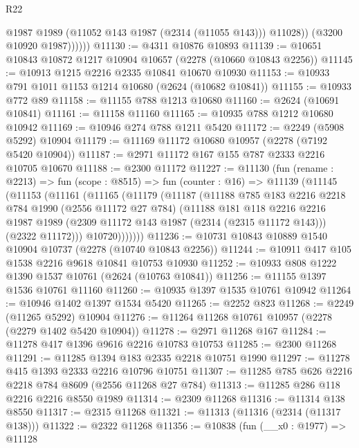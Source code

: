 \begin{lexlean}{R22}
\begin{coremodule}
                  @1987
                  @1989
                  (@11052 @143 @1987 (@2314 (@11055 @143)))
                  @11028))
              (@3200 @10920 @1987))))))
@11130 := @4311 @10876 @10893
@11139 := @10651 @10843 @10872 @1217 @10904 @10657 (@2278 (@10660 @10843 @2256))
@11145 := @10913 @1215 @2216 @2335 @10841 @10670 @10930
@11153 := @10933 @791 @1011 @1153 @1214 @10680 (@2624 (@10682 @10841))
@11155 := @10933 @772 @89
@11158 := @11155 @788 @1213 @10680
@11160 := @2624 (@10691 @10841)
@11161 := @11158 @11160
@11165 := @10935 @788 @1212 @10680 @10942
@11169 := @10946 @274 @788 @1211 @5420
@11172 := @2249 (@5908 @5292) @10904
@11179 := @11169 @11172 @10680 @10957 (@2278 (@7192 @5420 @10904))
@11187 := @2971 @11172 @167 @155 @787 @2333 @2216 @10705 @10670
@11188 := @2300 @11172
@11227 := @11130
    (fun (rename : @2213) =>
    fun (scope : @8515) =>
    fun (counter : @16) =>
    @11139
      (@11145
        (@11153
          (@11161
            (@11165
              (@11179
                (@11187
                  (@11188
                    @785
                    @183
                    @2216
                    @2218
                    @784
                    @1990
                    (@2556 @11172 @27 @784)
                    (@11188
                      @181
                      @118
                      @2216
                      @2216
                      @1987
                      @1989
                      (@2309 @11172 @143 @1987 (@2314 (@2315 @11172 @143)))
                      (@2322 @11172)))
                  @10720)))))))
@11236 := @10731 @10843 @10889 @1540 @10904 @10737 (@2278 (@10740 @10843 @2256))
@11244 := @10911 @417 @105 @1538 @2216 @9618 @10841 @10753 @10930
@11252 := @10933 @808 @1222 @1390 @1537 @10761 (@2624 (@10763 @10841))
@11256 := @11155 @1397 @1536 @10761 @11160
@11260 := @10935 @1397 @1535 @10761 @10942
@11264 := @10946 @1402 @1397 @1534 @5420
@11265 := @2252 @823
@11268 := @2249 (@11265 @5292) @10904
@11276 := @11264 @11268 @10761 @10957 (@2278 (@2279 @1402 @5420 @10904))
@11278 := @2971 @11268 @167
@11284 := @11278 @417 @1396 @9616 @2216 @10783 @10753
@11285 := @2300 @11268
@11291 := @11285 @1394 @183 @2335 @2218 @10751 @1990
@11297 := @11278 @415 @1393 @2333 @2216 @10796 @10751
@11307 := @11285 @785 @626 @2216 @2218 @784 @8609 (@2556 @11268 @27 @784)
@11313 := @11285 @286 @118 @2216 @2216 @8550 @1989
@11314 := @2309 @11268
@11316 := @11314 @138 @8550
@11317 := @2315 @11268
@11321 := @11313 (@11316 (@2314 (@11317 @138)))
@11322 := @2322 @11268
@11356 := @10838
    (fun (__x0 : @1977) =>
    @11128

\end{coremodule}
\end{lexlean}
